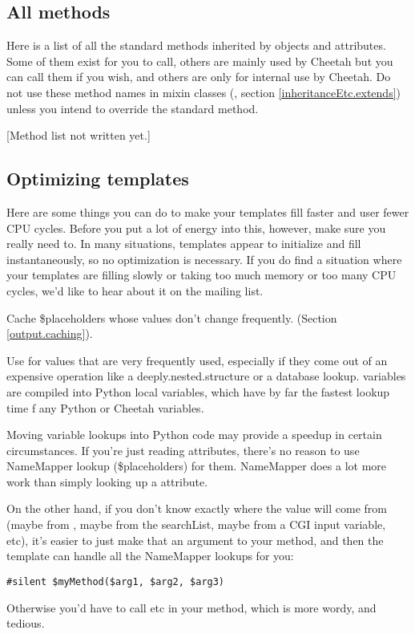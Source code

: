 \subsection{All methods}
\label{tips.allMethods}

Here is a list of all the standard methods inherited by  objects
and attributes.  Some of them exist for you to call, others are mainly used by
Cheetah but you can call them if you wish, and others are only for internal use
by Cheetah.  Do not use these method names in mixin classes (,
section \ref{inheritanceEtc.extends}) unless you intend to override the
standard method.  

[Method list not written yet.]

\subsection{Optimizing templates}
\label{tips.optimizing}

Here are some things you can do to make your templates fill faster and user
fewer CPU cycles.  Before you put a lot of energy into this, however, make
sure you really need to.  In many situations, templates appear to initialize
and fill instantaneously, so no optimization is necessary.  If you do find a
situation where your templates are filling slowly or taking too much memory or
too many CPU cycles, we'd like to hear about it on the mailing list.

Cache \$placeholders whose values don't change frequently.  (Section
\ref{output.caching}).

Use  for values that are very frequently used, especially if they
come out of an expensive operation like a deeply.nested.structure or a
database lookup.   variables are compiled into Python local
variables, which have by far the fastest lookup time f any Python or Cheetah
variables.

Moving variable lookups into Python code may provide a speedup in certain
circumstances.  If you're just reading  attributes, there's no
reason to use NameMapper lookup (\$placeholders) for them.  NameMapper does
a lot more work than simply looking up a  attribute.  

On the other hand, if you don't know exactly where the value will come from
(maybe from , maybe from the searchList, maybe from a CGI input
variable, etc), it's easier to just make that an argument to your method, and
then the template can handle all the NameMapper lookups for you:
\begin{verbatim}
#silent $myMethod($arg1, $arg2, $arg3)
\end{verbatim}
Otherwise you'd have to call  etc in your
method, which is more wordy, and tedious.



